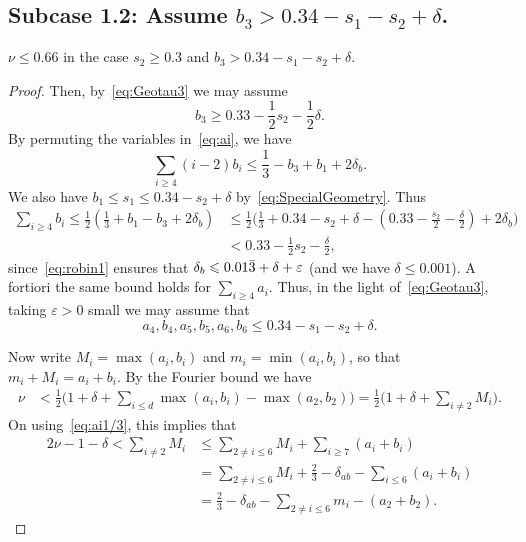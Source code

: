 \subsection*{Subcase 1.2: Assume $b_3> 0.34-s_1-s_2+\delta$.}
\begin{lemma}\label{lem:Subcase1.2}
  \leanok
  $\nu \leq 0.66$ in the case $s_2 \geq 0.3$ and $b_3 > 0.34-s_1-s_2+\delta$.
\end{lemma}
\begin{proof}
  Then, by~\eqref{eq:Geotau3} we may assume
  \begin{equation}\label{eq:b3}
    b_3\geq 0.33 -\frac{1}{2}s_2-\frac{1}{2}\delta.
  \end{equation}
  By permuting the variables in~\eqref{eq:ai}, we have
  \[
  \sum_{i\ge4} (i-2)b_i\le\frac{1}{3}-b_3+b_1 + 2\delta_b.
  \]
  We also have
  $b_1\leq s_1\leq 0.34 -s_2+\delta$
  by~\eqref{eq:SpecialGeometry}.
  Thus
  \begin{align*}
    \sum_{i\geq 4}b_i \le \frac{1}{2}\left(\frac{1}{3}+b_1-b_3+2\delta_b\right)
    &\le \frac{1}{2}\Big(\frac{1}{3}+0.34
    -s_2+\delta
    -
    (0.33
    -\frac{s_2}{2}
    -\frac{\delta}{2})
    +2\delta_b\Big)\\ &< 0.33-\frac{1}{2}s_2-\frac{\delta}{2},
  \end{align*}
  since~\eqref{eq:robin1} ensures that $\delta_b\leqslant 0.01\bar 3+\delta+\varepsilon$ (and we have $\delta\leq 0.001$).
  A fortiori the same bound holds for $\sum_{i\geq 4}a_i$.
  Thus, in the light of~\eqref{eq:Geotau3}, taking $\varepsilon>0$ small we may assume that
  \[
  a_4,b_4,a_5,b_5,a_6,b_6\leq 0.34-s_1-s_2+\delta.
  \]

  Now write $M_i = \max(a_i,b_i)$ and $m_i = \min(a_i,b_i)$, so that $m_i+M_i=a_i+b_i$.
  By the Fourier bound we have
  \begin{align*}
  \nu & < \frac{1}{2}\Big(1+\delta+ \sum_{i\leq d} \max(a_i,b_i) - \max(a_2,b_2)\Big) = \frac{1}{2}\Big(1 +\delta+ \sum_{i\neq 2}M_i\Big).
  \end{align*}
  On using~\eqref{eq:ai1/3},
  this implies that
  \begin{align*}
  2\nu -1-\delta < \sum_{i\neq 2} M_i &\le \sum_{2\neq i \le 6}M_i + \sum_{i\ge7} (a_i+b_i)\\
  &= \sum_{2\neq i \le 6}M_i + \frac{2}{3} -\delta_{ab} - \sum_{i\le 6}(a_i+b_i)\\
  &= \frac{2}{3} -\delta_{ab}-\sum_{2\neq i \le 6}m_i - (a_2+b_2).
  \end{align*}


\end{proof}

